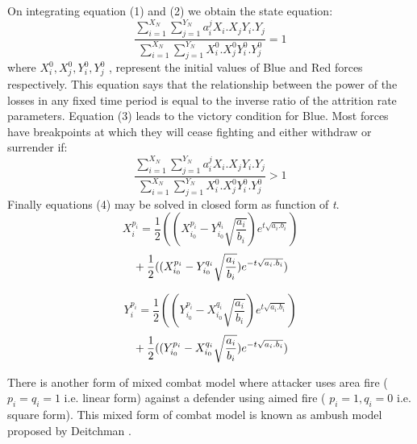 \documentclass[]{article}
\begin{document}
On integrating equation (1) and (2) we obtain the state equation:
\begin{equation} 
      \frac{{\sum\limits_{i=1}^{X_{N}}}\sum\limits_{j=1}^{Y_{N}}{{a_{i}^j}{X_{i}.X_{j}}{{Y_{i}.Y_{j}}} }}{{\sum\limits_{i=1}^{X_{N}}}\sum\limits_{j=1}^{Y_{N}}{X_{i}^0.X_{j}^0}{{Y_{i}^0.Y_{j}^0}} }=1 
\end{equation}
where ${X_{i}^0,X_{j}^0,Y_{i}^0,Y_{j}^0}$ , represent the initial values of Blue and Red forces respectively. This equation says that the relationship between the power of the losses in any fixed time period is equal to the inverse ratio of the attrition rate parameters. Equation (3) leads to the victory condition for Blue. Most forces have breakpoints at which they will cease fighting and either withdraw or surrender if:  
\begin{equation} 
      \frac{{\sum\limits_{i=1}^{X_{N}}}\sum\limits_{j=1}^{Y_{N}}{{a_{i}^j}{X_{i}.X_{j}}{{Y_{i}.Y_{j}}} }}{{\sum\limits_{i=1}^{X_{N}}}\sum\limits_{j=1}^{Y_{N}}{X_{i}^0.X_{j}^0}{{Y_{i}^0.Y_{j}^0}} }>1
\end{equation}
Finally equations (4) may be solved in closed form as function of \textit{t}.
\begin{equation}
       X_{i}^{p_i}=\frac{1}{2}((X_{i_{0}}^{p_i}-Y_{i_{0}}^{q_i}\sqrt{\frac{a_{i}}{b_{i}}})e^{t\sqrt{a_i.b_i}}) 
       \nonumber
\end{equation}
\begin{equation}\\+\frac{1}{2}((X_{i_{0}}^{p_i}-Y_{i_{0}}^{q_i}\sqrt{\frac{a_{i}}{b_{i}}})e^{-t\sqrt{a_i.b_i}})
\end{equation}

\begin{equation}
       Y_{i}^{p_i}=\frac{1}{2}((Y_{i_{0}}^{p_i}-X_{i_{0}}^{q_i}\sqrt{\frac{a_{i}}{b_{i}}})e^{t\sqrt{a_i.b_i}}) 
       \nonumber
\end{equation}
\begin{equation}\\+\frac{1}{2}((Y_{i_{0}}^{p_i}-X_{i_{0}}^{q_i}\sqrt{\frac{a_{i}}{b_{i}}})e^{-t\sqrt{a_i.b_i}})
\end{equation}

There is another form of mixed combat model where attacker uses area fire (\begin{math}{{p_{i}=q_{i}=1}}\end{math} i.e. linear form) against a defender using aimed fire ( \begin{math}{p_{i}=1, q_{i}=0}\end{math} i.e. square form). This mixed form of combat model is known as ambush model proposed by Deitchman \autocite{deitchman:1962lanchester}.
\end{document}
